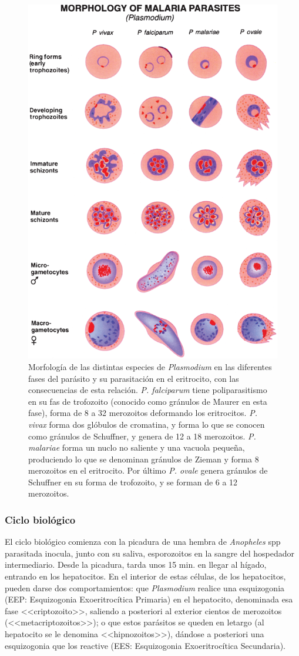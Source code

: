 \begin{figure}[H]
	\centering
	\includegraphics[trim=0 0 0 2cm,clip,width=0.75\columnwidth]{A.imagenes/ACV-BioSan-Parasit-PlasmodiumMorf}
	\caption[Morfología de las distintas especies de \textit{Plasmodium}]{Morfología de las distintas especies de \textit{Plasmodium} en las diferentes fases del parásito y su parasitación en el eritrocito, con las consecuencias de esta relación. \textit{P. falciparum} tiene poliparasitismo en su fas de trofozoito (conocido como gránulos de Maurer en esta fase), forma de 8 a 32 merozoitos deformando los eritrocitos. \textit{P. vivax} forma dos glóbulos de cromatina, y forma lo que se conocen como gránulos de Schuffner, y genera de 12 a 18 merozoitos. \textit{P. malariae} forma un nuclo no saliente y una vacuola pequeña, produciendo lo que se denominan gránulos de Zieman y forma 8 merozoitos en el eritrocito. Por último \textit{P. ovale} genera gránulos de Schuffner en su forma de trofozoito, y se forman de 6 a 12 merozoitos.}
\end{figure}
\subsubsection{Ciclo biológico}
El ciclo biológico comienza con la picadura de una hembra de \textit{Anopheles} spp parasitada inocula, junto con su saliva, esporozoitos en la sangre del hospedador intermediario. Desde la picadura, tarda unos 15 min. en llegar al hígado, entrando en los hepatocitos. En el interior de estas células, de los hepatocitos, pueden darse dos comportamientos: que \textit{Plasmodium} realice una esquizogonia (EEP: Esquizogonia Exoeritrocítica Primaria) en el hepatocito, denominada esa fase <<criptozoito>>, saliendo a posteriori al exterior cientos de merozoitos (<<metacriptozoitos>>); o que estos parásitos se queden en letargo (al hepatocito se le denomina <<hipnozoitos>>), dándose a posteriori una esquizogonia que los reactive (EES: Esquizogonia Exoeritrocítica Secundaria).

